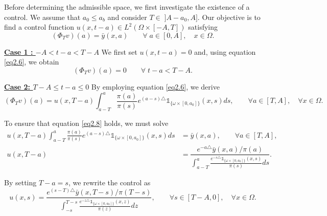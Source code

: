 \documentclass[10pt, a4]{amsart}
\makeatletter
\newcounter{assu}
\theoremstyle{plain}
\theoremstyle{definition}
\theoremstyle{remark}
\renewenvironment{proof}[1][\proofname]{\par
  \pushQED{\qed}%
  \normalfont \topsep6\p@\@plus6\p@\relax
  \trivlist
  \item[\hskip\labelsep
        \itshape
    #1\ \ref{#1}.]\ignorespaces
}{%
  \popQED\endtrivlist\@endpefalse
}
\numberwithin{equation}{section}
\makeatother
\begin{document}
\begin{proof}[of Proposition \ref{pr2.3}]
Before determining the admissible space, we first investigate the existence of a control. We assume that \( a_0 \leq a_b \) and consider \( T \in \;] A-a_0, A] \). Our objective is to find a control function \( u(x,t-a) \in L^2 (\Omega\times [-A,T]) \) satisfying  
\begin{equation}\label{eq2.8}
(\Phi_T v)(a) =\bar{y}(x,a) \qquad \forall \;a\in [0,A],\quad x\in \Omega.
\end{equation}  

{\bf \underline{Case 1 : \( -A < t-a < T-A \)}}
We first set \( u(x,t-a) = 0 \) and, using equation \eqref{eq2.6}, we obtain  
\begin{equation}\label{eq2.9}
(\Phi_T v)(a) = 0 \qquad \forall \;t-a<T-A.
\end{equation}  

{\bf \underline{Case 2: \( T-A \leq t-a \leq 0 \)}}  
By employing equation \eqref{eq2.6}, we derive  
\begin{equation}
(\Phi_T v)(a) = u(x,T-a) \int_{a-T}^{a} \frac{\pi(a)}{\pi(s)} e^{(a-s)\triangle} \mathds{1}_{\lbrace\omega\times[0,a_0]\rbrace}(x,s) ds, \qquad \forall a\in [T,A],\quad \forall x\in \Omega.
\end{equation}  

To ensure that equation \eqref{eq2.8} holds, we must solve  
\begin{align*}
u(x,T-a) \int_{a-T}^{a} \frac{\pi(a)}{\pi(s)} e^{(a-s)\triangle} \mathds{1}_{\lbrace\omega\times[0,a_0]\rbrace}(x,s) ds &= \bar{y}(x,a), \qquad \forall a\in [T,A], \\
u(x,T-a) &= \dfrac{e^{-a\triangle} \bar{y}(x,a) / \pi(a)}{\displaystyle\int_{a-T}^{a} \frac{e^{-s\triangle} \mathds{1}_{\lbrace\omega\times[0,a_0]\rbrace}(x,s)}{\pi(s)} ds}.
\end{align*}  

By setting \( T-a = s \), we rewrite the control as  
\begin{equation}\label{eq2.11}
u(x,s) = \dfrac{e^{(s-T)\triangle} \bar{y}(x,T-s) / \pi(T-s)}{\displaystyle\int_{-s}^{T-s} \frac{e^{-z\triangle} \mathds{1}_{\lbrace\omega\times[0,a_0]\rbrace}(x,z)}{\pi(z)} dz}, \qquad \forall s\in [T-A,0],\quad \forall x\in \Omega.
\end{equation}  


\end{proof}
\end{document}
